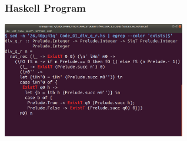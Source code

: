 
\begin{frame}

\frametitle{Haskell Program}

\begin{center}
\includegraphics[width=8cm]{FOLDER_3_IMG_FILES/Code_01_div_q_r_hs_whole.png}
\end{center}

\end{frame}

